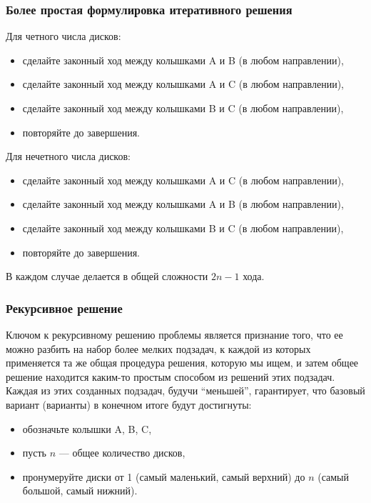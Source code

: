 \subsubsection*{Более простая формулировка итеративного решения}

Для четного числа дисков:

\begin{itemize}
	\item сделайте законный ход между колышками A и B (в любом направлении),
	\item сделайте законный ход между колышками A и C (в любом направлении),
	\item сделайте законный ход между колышками B и C (в любом направлении),
	\item повторяйте до завершения.
\end{itemize}

Для нечетного числа дисков:

\begin{itemize}
	\item сделайте законный ход между колышками A и C (в любом направлении),
	\item сделайте законный ход между колышками A и B (в любом направлении),
	\item сделайте законный ход между колышками B и C (в любом направлении),
	\item повторяйте до завершения.
\end{itemize}

В каждом случае делается в общей сложности $2n - 1$ хода.

\subsubsection{Рекурсивное решение}

Ключом к рекурсивному решению проблемы является признание того, что ее можно
разбить на набор более мелких подзадач, к каждой из которых применяется та же
общая процедура решения, которую мы ищем, и затем общее решение находится
каким-то простым способом из решений этих подзадач. Каждая из этих созданных
подзадач, будучи ``меньшей'', гарантирует, что базовый вариант (варианты) в
конечном итоге будут достигнуты:

\begin{itemize}
	\item обозначьте колышки A, B, C,
	\item пусть $n$ --- общее количество дисков,
	\item пронумеруйте диски от 1 (самый маленький, самый верхний) до $n$ (самый
	      большой, самый нижний).
\end{itemize}

